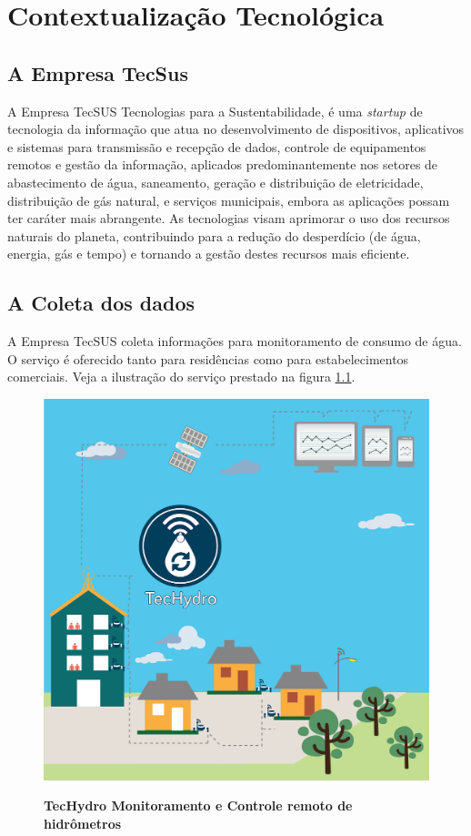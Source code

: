 \chapter{Contextualização Tecnológica}



\section{A Empresa TecSus}
\par A Empresa TecSUS Tecnologias para a Sustentabilidade, é uma \emph{startup} de tecnologia da informação que atua no desenvolvimento de dispositivos, aplicativos e sistemas para transmissão e recepção de dados, controle de equipamentos remotos e gestão da informação, aplicados predominantemente nos setores de abastecimento de água, saneamento, geração e distribuição de eletricidade, distribuição de gás natural, e serviços municipais, embora as aplicações possam ter caráter mais abrangente. As tecnologias visam aprimorar o uso dos recursos naturais do planeta, contribuindo para a redução do desperdício (de água, energia, gás e tempo) e tornando a gestão destes recursos mais eficiente.


\section{A Coleta dos dados}
\par A Empresa TecSUS coleta informações para monitoramento de consumo de água. O serviço é oferecido tanto para residências como para estabelecimentos comerciais. Veja a ilustração do serviço prestado na figura \ref{techid}.
\begin{figure}[ht]
	\caption{\textbf{TecHydro Monitoramento e Controle remoto de hidrômetros}}
	\centering
		\includegraphics[scale=0.3]{figuras/TecHydro}
	\label{techid}
\end{figure}


